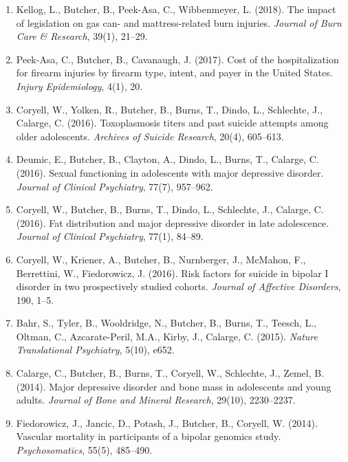 \documentclass[a4paper]{article}
\begin{document}
\begin{enumerate}

  \item Kellog, L., Butcher, B., Peek-Asa, C., Wibbenmeyer, L. (2018).
  The impact of legislation on gas can- and mattress-related
  burn injuries. \textit{Journal of Burn Care \& Research}, 39(1), 21--29.

  \item Peek-Asa, C., Butcher, B., Cavanaugh, J. (2017). Cost of the
  hospitalization for firearm injuries by firearm type, intent, and
  payer in the United States. \textit{Injury Epidemiology}, 4(1), 20.

  \item Coryell, W., Yolken, R., Butcher, B., Burns, T., Dindo, L., Schlechte,
  J., Calarge, C. (2016). Toxoplasmosis titers and past suicide attempts among
  older adolescents. \textit{Archives of Suicide Research}, 20(4), 605--613.

  \item Deumic, E., Butcher, B., Clayton, A., Dindo, L., Burns, T., Calarge,
  C. (2016). Sexual functioning in adolescents with major depressive disorder.
  \textit{Journal of Clinical Psychiatry}, 77(7), 957--962.

  \item Coryell, W., Butcher, B., Burns, T., Dindo, L., Schlechte, J.,
  Calarge, C. (2016). Fat distribution and major depressive disorder in
  late adolescence. \textit{Journal of Clinical Psychiatry}, 77(1), 84--89.

  \item Coryell, W., Kriener, A., Butcher, B., Nurnberger, J., McMahon, F.,
  Berrettini, W., Fiedorowicz, J. (2016). Risk factors for suicide in bipolar
  I disorder in two prospectively studied cohorts. \textit{Journal of Affective
  Disorders}, 190, 1--5.

  \item Bahr, S., Tyler, B., Wooldridge, N., Butcher, B., Burns, T., Teesch, L.,
  Oltman, C., Azcarate-Peril, M.A., Kirby, J., Calarge, C. (2015).
  \textit{Nature Translational Psychiatry}, 5(10), e652.

  \item Calarge, C., Butcher, B., Burns, T., Coryell, W., Schlechte, J., Zemel,
  B. (2014). Major depressive disorder and bone mass in adolescents and young
  adults. \textit{Journal of Bone and Mineral Research}, 29(10), 2230--2237.

  \item Fiedorowicz, J., Jancic, D., Potash, J., Butcher, B., Coryell, W.
  (2014). Vascular mortality in participants of a bipolar genomics study.
  \textit{Psychosomatics}, 55(5), 485--490.

\end{enumerate}
\end{document}
